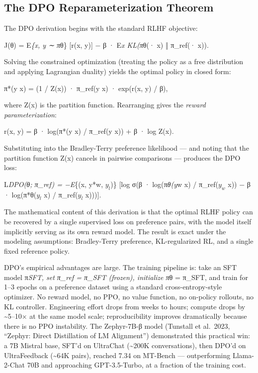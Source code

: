 \documentclass{article}
\begin{document}
\subsection{The DPO Reparameterization Theorem}\label{the-dpo-reparameterization-theorem}

The DPO derivation begins with the standard RLHF objective:

J(θ) = E\emph{\{x, y ∼ π}θ\} {[}r(x, y){]} − β · E\emph{x KL(π}θ(· \textbar{} x) ‖ π\_ref(· \textbar{} x)).

Solving the constrained optimization (treating the policy as a free distribution and applying Lagrangian duality) yields the optimal policy in closed form:

π*(y \textbar{} x) = (1 / Z(x)) · π\_ref(y \textbar{} x) · exp(r(x, y) / β),

where Z(x) is the partition function. Rearranging gives the \emph{reward parameterization}:

r(x, y) = β · log(π*(y \textbar{} x) / π\_ref(y \textbar{} x)) + β · log Z(x).

Substituting into the Bradley-Terry preference likelihood --- and noting that the partition function Z(x) cancels in pairwise comparisons --- produces the DPO loss:

L\emph{DPO(θ; π\_ref) = −E}\{(x, y*w, \(y_l\))\} {[}log σ(β · log(π\emph{θ(y}w \textbar{} x) / π\_ref(\(y_w\) \textbar{} x)) − β · log(π*θ(\(y_l\) \textbar{} x) / π\_ref(\(y_l\) \textbar{} x))){]}.

The mathematical content of this derivation is that the optimal RLHF policy can be recovered by a single supervised loss on preference pairs, with the model itself implicitly serving as its own reward model. The result is exact under the modeling assumptions: Bradley-Terry preference, KL-regularized RL, and a single fixed reference policy.

DPO's empirical advantages are large. The training pipeline is: take an SFT model π\emph{SFT, set π\_ref = π\_SFT (frozen), initialize π}θ = π\_SFT, and train for 1--3 epochs on a preference dataset using a standard cross-entropy-style optimizer. No reward model, no PPO, no value function, no on-policy rollouts, no KL controller. Engineering effort drops from weeks to hours; compute drops by \textasciitilde5--10× at the same model scale; reproducibility improves dramatically because there is no PPO instability. The Zephyr-7B-β model (Tunstall et al.~2023, ``Zephyr: Direct Distillation of LM Alignment'') demonstrated this practical win: a 7B Mistral base, SFT'd on UltraChat (\textasciitilde200K conversations), then DPO'd on UltraFeedback (\textasciitilde64K pairs), reached 7.34 on MT-Bench --- outperforming Llama-2-Chat 70B and approaching GPT-3.5-Turbo, at a fraction of the training cost.
\end{document}
